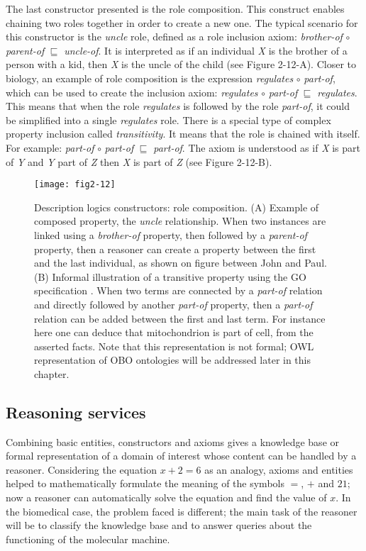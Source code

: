 The last constructor presented is the role composition. This construct enables chaining two roles together in order to create a new one. The typical scenario for this constructor is the \emph{uncle} role, defined as a role inclusion axiom: \emph{brother-of} $ \circ $ \emph{parent-of} $ \sqsubseteq $ \emph{uncle-of}. It is interpreted as if an individual \emph{X} is the brother of a person with a kid, then \emph{X} is the uncle of the child (see Figure 2-12-A). Closer to biology, an example of role composition is the expression \emph{regulates} $ \circ $ \emph{part-of}, which can be used to create the inclusion axiom: \emph{regulates} $ \circ $ \emph{part-of} $ \sqsubseteq $ \emph{regulates}. This means that when the role \emph{regulates} is followed by the role \emph{part-of}, it could be simplified into a single \emph{regulates} role. There is a special type of complex property inclusion called \emph{transitivity}. It means that the role is chained with itself. For example: \emph{part-of} $ \circ $ \emph{part-of} $ \sqsubseteq $ \emph{part-of}. The axiom is understood as if \emph{X} is part of \emph{Y} and \emph{Y} part of \emph{Z} then \emph{X} is part of \emph{Z} (see Figure 2-12-B).

\begin{figure}[ht]
    \centering
    \texttt{[image: fig2-12]}
    \caption{Description logics constructors: role composition. (A) Example of composed property, the \emph{uncle} relationship. When two instances are linked using a \emph{brother-of} property, then followed by a \emph{parent-of} property, then a reasoner can create a property between the first and the last individual, as shown on figure between John and Paul. (B) Informal illustration of a transitive property using the GO specification \citep{gorels}. When two terms are connected by a \emph{part-of} relation and directly followed by another \emph{part-of} property, then a \emph{part-of} relation can be added between the first and last term. For instance here one can deduce that mitochondrion is part of cell, from the asserted facts. Note that this representation is not formal; OWL representation of OBO ontologies will be addressed later in this chapter.}
    \label{fig2-12}
\end{figure}

\subsection{Reasoning services}

Combining basic entities, constructors and axioms gives a knowledge base or formal representation of a domain of interest whose content can be handled by a reasoner. Considering the equation $ x + 2 = 6 $ as an analogy, axioms and entities helped to mathematically formulate the meaning of the symbols $ = $, $ + $ and $ 21 $; now a reasoner can automatically solve the equation and find the value of $ x $. In the biomedical case, the problem faced is different; the main task of the reasoner will be to classify the knowledge base and to answer queries about the functioning of the molecular machine.

